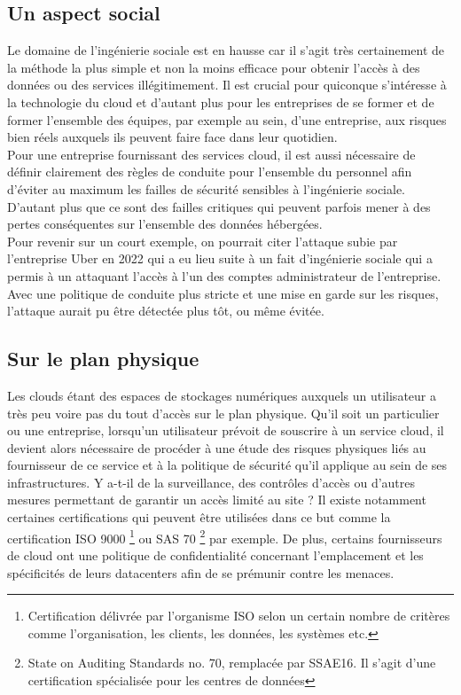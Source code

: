 \documentclass[a4paper, 12pt]{article}
\begin{document}
\begin{spacing}{1.1}
      \subsection{Un aspect social}
      Le domaine de l'ingénierie sociale est en hausse car il s'agit très
      certainement de la méthode la plus simple et non la moins efficace pour
      obtenir l'accès à des données ou des services illégitimement. Il est
      crucial pour quiconque s'intéresse à la technologie du cloud et d'autant
      plus pour les entreprises de se former et de former l'ensemble des
      équipes, par exemple au sein, d'une entreprise, aux risques bien réels
      auxquels ils peuvent faire face dans leur quotidien. \\

      Pour une entreprise fournissant des services cloud, il est aussi
      nécessaire de définir clairement des règles de conduite pour l'ensemble du
      personnel afin d'éviter au maximum les failles de sécurité sensibles à
      l'ingénierie sociale. D'autant plus que ce sont des failles critiques qui
      peuvent parfois mener à des pertes conséquentes sur l'ensemble des données
      hébergées. \\

      Pour revenir sur un court exemple, on pourrait citer l'attaque subie par
      l'entreprise Uber en 2022 qui a eu lieu suite à un fait d'ingénierie
      sociale qui a permis à un attaquant l'accès à l'un des comptes
      administrateur de l'entreprise. Avec une politique de conduite plus
      stricte et une mise en garde sur les risques, l'attaque aurait pu être
      détectée plus tôt, ou même évitée. \\

    \subsection{Sur le plan physique}
      Les clouds étant des espaces de stockages numériques auxquels un
      utilisateur a très peu voire pas du tout d'accès sur le plan physique.
      Qu'il soit un particulier ou une entreprise, lorsqu'un utilisateur
      prévoit de souscrire à un service cloud, il devient alors nécessaire de
      procéder à une étude des risques physiques liés au fournisseur de
      ce service et à la politique de sécurité qu'il applique au sein de ses
      infrastructures. Y a-t-il de la surveillance, des contrôles d'accès ou
      d'autres mesures permettant de garantir un accès limité au site ? Il
      existe notamment certaines certifications qui peuvent être utilisées dans
      ce but comme la certification ISO 9000 \footnote{Certification délivrée
      par l'organisme ISO selon un certain nombre de critères comme
      l'organisation, les clients, les données, les systèmes etc.} ou SAS 70
      \footnote{State on Auditing Standards no. 70, remplacée par SSAE16. Il
      s'agit d'une certification spécialisée pour les centres de données} par
      exemple. De plus, certains fournisseurs de cloud ont une politique de
      confidentialité concernant l'emplacement et les spécificités de leurs
      datacenters afin de se prémunir contre les menaces. \\


\end{spacing}
\end{document}
